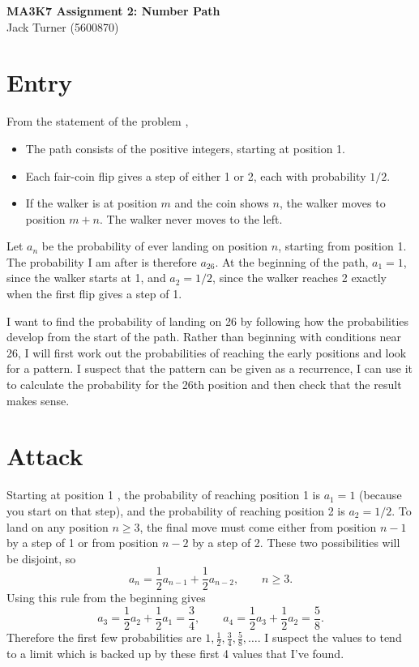 \documentclass[11pt]{article}
\newcommand{\keywordfont}{\textsc}
\newcommand{\keyword}[1]{%
  \marginpar{\raggedright\small\keywordfont{#1}}}
\begin{document}
\Large
\begin{center}
\textbf{MA3K7 Assignment 2: Number Path}
\\
Jack Turner (5600870)
\end{center}
\normalsize

\section{Entry}

From the statement of the problem \keyword{I KNOW} ,
\begin{itemize}
  \item The path consists of the positive integers, starting at position 1.
  \item Each fair-coin flip gives a step of either 1 or 2, each with probability $1/2$.
  \item If the walker is at position $m$ and the coin shows $n$, the walker moves to position $m+n$. The walker never moves to the left.
\end{itemize}

Let $a_n$ be the probability of ever landing on position $n$, starting from position 1. \keyword{NOTATION} The probability I am after is therefore $a_{26}$. At the beginning of the path, $a_1=1$, since the walker starts at 1, and $a_2=1/2$, since the walker reaches 2 exactly when the first flip gives a step of 1.

I want \keyword{I WANT} to find the probability of landing on 26 by following how the probabilities develop from the start of the path. Rather than beginning with conditions near 26, I will first work out the probabilities of reaching the early positions and look for a pattern. I suspect that the pattern can be given as a recurrence, I can use it to calculate the probability for the 26th position and then check that the result makes sense.

\section{Attack}

Starting at position 1 \keyword{TRY}, the probability of reaching position 1 is $a_1=1$ (because you start on that step), and the probability of reaching position 2 is $a_2=1/2$. To land on any position $n\geq 3$, the final move must come either from position $n-1$ by a step of 1 or from position $n-2$ by a step of 2. These two possibilities will be disjoint, so
\[
 a_n=\frac12a_{n-1}+\frac12a_{n-2},\qquad n\geq 3.
\]
Using this rule from the beginning gives
\[
 a_3=\frac12a_2+\frac12a_1=\frac34,\qquad
 a_4=\frac12a_3+\frac12a_2=\frac58.
\]
Therefore the first few probabilities are $1,\frac12,\frac34,\frac58,\ldots$. I suspect the values to tend to a limit which is backed up by these first 4 values that I've found.
\end{document}
